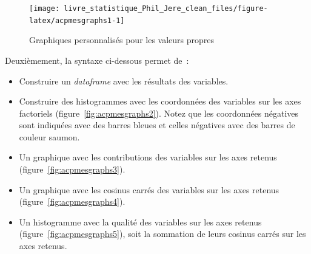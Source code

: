 \documentclass[
  11pt,
  french,
]{book}
\providecommand{\tightlist}{%
  \setlength{\itemsep}{0pt}\setlength{\parskip}{0pt}}
\begin{document}
\begin{figure}

{\centering \texttt{[image: livre\_statistique\_Phil\_Jere\_clean\_files/figure-latex/acpmesgraphs1-1]} 

}

\caption{Graphiques personnalisés pour les valeurs propres}\label{fig:acpmesgraphs1}
\end{figure}

Deuxièmement, la syntaxe ci-dessous permet de~:

\begin{itemize}
\tightlist
\item
  Construire un \emph{dataframe} avec les résultats des variables.
\item
  Construire des histogrammes avec les coordonnées des variables sur les axes factoriels (figure~\ref{fig:acpmesgraphs2}). Notez que les coordonnées négatives sont indiquées avec des barres bleues et celles négatives avec des barres de couleur saumon.
\item
  Un graphique avec les contributions des variables sur les axes retenus (figure~\ref{fig:acpmesgraphs3}).
\item
  Un graphique avec les cosinus carrés des variables sur les axes retenus (figure~\ref{fig:acpmesgraphs4}).
\item
  Un histogramme avec la qualité des variables sur les axes retenus (figure~\ref{fig:acpmesgraphs5}), soit la sommation de leurs cosinus carrés sur les axes retenus.
\end{itemize}
\end{document}
